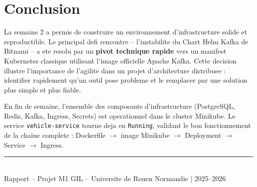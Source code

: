 \documentclass[12pt,a4paper]{article}
\begin{document}
\section{Conclusion}

La semaine 2 a permis de construire un environnement d'infrastructure solide et
reproductible. Le principal defi rencontre -- l'instabilite du Chart Helm Kafka de
Bitnami -- a ete resolu par un \textbf{pivot technique rapide} vers un manifest
Kubernetes classique utilisant l'image officielle Apache Kafka. Cette decision illustre
l'importance de l'agilite dans un projet d'architecture distribuee : identifier rapidement
qu'un outil pose probleme et le remplacer par une solution plus simple et plus fiable.

En fin de semaine, l'ensemble des composants d'infrastructure (PostgreSQL, Redis, Kafka,
Ingress, Secrets) est operationnel dans le cluster Minikube. Le service
\texttt{vehicle-service} tourne deja en \texttt{Running}, validant le bon fonctionnement
de la chaine complete : Dockerfile $\rightarrow$ image Minikube $\rightarrow$ Deployment
$\rightarrow$ Service $\rightarrow$ Ingress.

\vspace{1cm}
\begin{center}
\rule{0.5\linewidth}{0.4pt}\\[0.3cm]
{\small Rapport -- Projet M1 GIL -- Universite de Rouen Normandie | 2025--2026}
\end{center}
\end{document}
